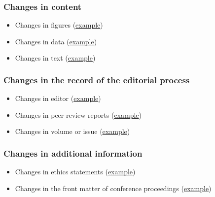 \documentclass[letterpaper, 12pt]{article}
\begin{document}
\subsubsection*{Changes in content}
\begin{itemize}
    \setlength\itemsep{-0.5em}
    \item Changes in figures (\href{https://pubpeer.com/publications/8A0A30197C521C60F66C30EE04ED28#3}{example})
    \item Changes in data (\href{https://pubpeer.com/publications/DF35D0840056D8CD080CC36DA2609E#2}{example})
    \item Changes in text (\href{https://pubpeer.com/publications/6A8918534C304C6BD58F51DC126838#3}{example})
\end{itemize}

\subsubsection*{Changes in the record of the editorial process}
\begin{itemize}
    \setlength\itemsep{-0.5em}
    \item Changes in editor (\href{https://pubpeer.com/publications/B6D6D44CCE307C39E1878FE2563B32#3}{example})
    \item Changes in peer-review reports (\href{https://pubpeer.com/publications/B23B7D3A9182DC56825D4EE77FDD57#2}{example})
    \item Changes in volume or issue (\href{https://pubpeer.com/publications/E709DA77E2AFA89FA2222039B667E8#3}{example})
\end{itemize}

\subsubsection*{Changes in additional information}
\begin{itemize}
    \setlength\itemsep{-0.5em}
    \item Changes in ethics statements (\href{https://pubpeer.com/publications/A79BA92C456051E62C1FAB00E2B077#4}{example})
    \item Changes in the front matter of conference proceedings (\href{https://pubpeer.com/publications/69ADFB2B2293E4DDEC736C71CF6B6F#5}{example})
\end{itemize}
\end{document}
